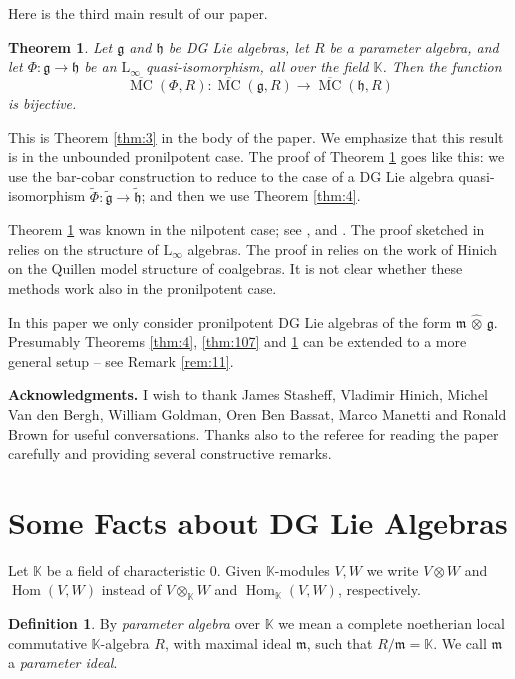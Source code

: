 \documentclass[a4paper,10pt]{amsart}
\newtheorem{thm}[equation]{Theorem}
\theoremstyle{definition}
\newtheorem{dfn}[equation]{Definition}
\numberwithin{equation}{section}
\newcommand{\opn}{\operatorname}
\newcommand{\ol}{\overline}
\newcommand{\mfrak}[1]{\mathfrak{#1}}
\newcommand{\mrm}[1]{\mathrm{#1}}
\newcommand{\mbb}[1]{\mathbb{#1}}
\newcommand{\til}[1]{\tilde{#1}}
\newcommand{\what}[1]{\widehat{#1}}
\newcommand{\hatotimes}{\, \what{\otimes} \,}
\newcommand{\hot}{\hatotimes}
\newcommand{\K}{\mbb{K}}
\newcommand{\g}{\mfrak{g}}
\newcommand{\m}{\mfrak{m}}
\newcommand{\h}{\mfrak{h}}
\begin{document}
Here is the third main result of our paper.

\begin{thm} \label{thm:1}
Let $\g$ and $\h$ be DG Lie algebras, let $R$ be a parameter algebra, and let 
$\Phi : \g \to \h$ be an $\mrm{L}_{\infty}$ quasi-isomorphism, all over the
field $\K$. Then the function 
\[ \ol{\opn{MC}}(\Phi, R) : \ol{\opn{MC}}(\g, R) \to \ol{\opn{MC}}(\h, R)  \]
is bijective.
\end{thm}

This is Theorem \ref{thm:3} in the body of the paper. We emphasize
that this result is in the unbounded pronilpotent case. 
The proof of Theorem \ref{thm:1} goes like this: we use the bar-cobar
construction to reduce to the case of a DG Lie algebra quasi-isomorphism
$\til{\Phi} : \til{\g} \to \til{\h}$; and
then we use Theorem \ref{thm:4}.

Theorem \ref{thm:1} was known in the nilpotent case; see 
\cite[Theorem  4.6]{Ko2}, and  \cite[Theorem 3.6.2]{CKTB}. 
The proof sketched in \cite[Section 4.5]{Ko2} relies on the structure 
of $\mrm{L}_{\infty}$ algebras. The proof in
\cite[Section 3.7]{CKTB} relies on the work of Hinich on the Quillen model
structure of coalgebras. It is not clear whether these methods work also in the
pronilpotent case. 

In this paper we only consider pronilpotent DG Lie algebras of the form 
$\m \hot \g$. 
Presumably Theorems \ref{thm:4}, \ref{thm:107} and \ref{thm:1} can be extended
to a more general setup -- see Remark \ref{rem:11}.

\medskip \noindent
{\bf Acknowledgments.} 
I wish to thank James Stasheff, Vladimir Hinich, Michel Van den Bergh,
William Goldman, Oren Ben Bassat, Marco Manetti and Ronald Brown
for useful conversations.
Thanks also to the referee for reading the paper carefully and providing
several constructive remarks.


\section{Some Facts about DG Lie Algebras}
\label{sec:facts}

Let $\K$ be a field of characteristic $0$.
Given $\K$-modules $V, W$ we write $V \otimes W$ and 
$\opn{Hom}(V, W)$ instead of $V \otimes_{\K} W$ and $\opn{Hom}_{\K}(V, W)$,
respectively.

\begin{dfn}
By {\em parameter algebra} over $\K$ we mean a complete noetherian local
commutative $\K$-algebra $R$, with maximal ideal $\m$, such that $R / \m = \K$.
We call $\m$ a {\em parameter ideal}.
\end{dfn}
\end{document}

